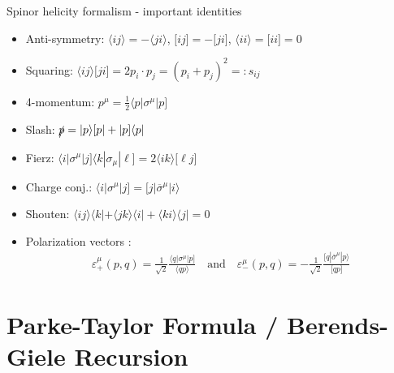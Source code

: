 \documentclass[10pt]{beamer}
\begin{document}
\begin{frame}{Spinor helicity formalism - important identities}

    \begin{itemize}[<+->]
        \item Anti-symmetry: {\scriptsize$\langle ij \rangle = - \langle ji \rangle$}, {\scriptsize$\lbrack ij \rbrack = - \lbrack ji \rbrack$}, {\scriptsize$\langle ii \rangle = \lbrack ii \rbrack = 0$}
        \item Squaring: {\scriptsize$\langle ij \rangle \lbrack ji \rbrack = 2 p_i \cdot p_j = \left( p_i + p_j \right)^2 =: s_{ij}$}
        \item 4-momentum: {\scriptsize$p^{\mu} = \frac{1}{2} \langle p | \sigma^{\mu} | p \rbrack $}
        \item Slash: {\scriptsize$\slashed{p} = | p \rangle \lbrack p | + | p \rbrack \langle p |$}
        \item Fierz: {\scriptsize$ \langle i | \sigma^{\mu} | j \rbrack \langle k | \sigma_{\mu} | \ell \rbrack = 2 \langle ik \rangle \lbrack \ell j \rbrack$}
        \item Charge conj.: {\scriptsize$ \langle i | \sigma^{\mu} | j \rbrack = \lbrack j | \overline{\sigma}^{\mu} | i \rangle$}
        \item Shouten: {\scriptsize$ \langle ij \rangle \langle k | + \langle jk \rangle \langle i | + \langle ki \rangle \langle j | = 0$}
        \item Polarization vectors \cite{xu86}: {\scriptsize
        \begin{align*}
            \varepsilon_{+}^{\mu}(p,q) = \frac{1}{\sqrt{2}} \frac{\langle q | \sigma^{\mu} | p \rbrack }{ \langle qp \rangle } \quad \text{and} \quad \varepsilon_{-}^{\mu}(p,q) = - \frac{1}{\sqrt{2}} \frac{\lbrack q | \overline{\sigma}^{\mu} | p \rangle }{ \lbrack qp \rbrack }
        \end{align*}
        }
    \end{itemize}

\end{frame}

\section{Parke-Taylor Formula / Berends-Giele Recursion}
\end{document}
